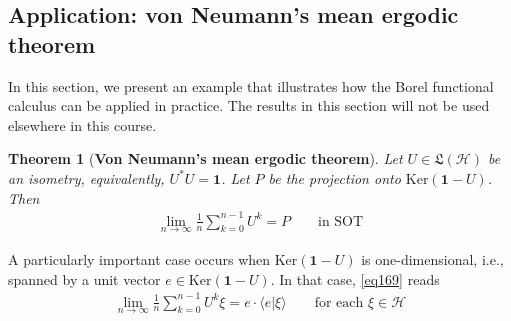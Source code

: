 \documentclass[12pt,b5paper,notitlepage]{article}
\theoremstyle{definition}
\theoremstyle{plain}
\newtheorem{thm}[df]{Theorem}
\newcommand{\fk}{\mathfrak}
\newcommand{\idt}{\mathbf{1}}
\newcommand{\bk}[1]{\langle {#1}\rangle}
\newcommand{\Ker}{\mathrm{Ker}}
\newcommand{\MH}{\mathcal H}
\numberwithin{equation}{section}
\begin{document}
\subsection{Application: von Neumann's mean ergodic theorem}

In this section, we present an example that illustrates how the Borel functional calculus can be applied in practice. The results in this section will not be used elsewhere in this course.



\begin{thm}[\textbf{Von Neumann's mean ergodic theorem}]\label{lb321} 
Let $U\in\fk L(\MH)$ be an isometry, equivalently, $U^*U=\idt$. Let $P$ be the projection onto $\Ker(\idt-U)$. Then
\begin{align}\label{eq169}
\lim_{n\rightarrow\infty}\frac 1{n}\sum_{k=0}^{n-1}U^k=P\qquad\text{in SOT}
\end{align}
\end{thm}

A particularly important case occurs when $\Ker(\idt-U)$ is one-dimensional, i.e., spanned by a unit vector $e\in\Ker(\idt-U)$. In that case, \eqref{eq169} reads
\begin{align}
\lim_{n\rightarrow\infty}\frac 1{n}\sum_{k=0}^{n-1}U^k\xi=e\cdot\bk{e|\xi}\qquad\text{for each }\xi\in\MH
\end{align}
\end{document}
